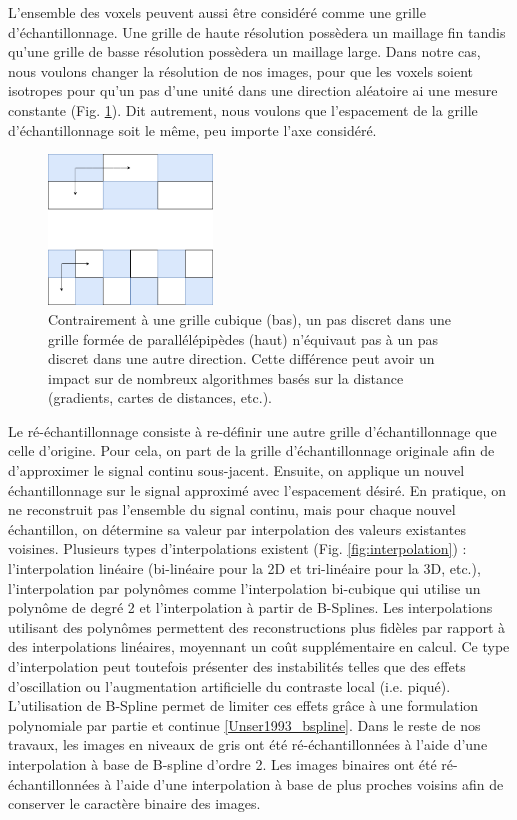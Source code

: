 L'ensemble des voxels peuvent aussi être considéré comme une grille d'échantillonnage. Une grille de haute résolution possèdera un maillage fin tandis qu'une grille de basse résolution possèdera un maillage large. Dans notre cas, nous voulons changer la résolution de nos images, pour que les voxels soient isotropes pour qu'un pas d'une unité dans une direction aléatoire ai une mesure constante (Fig. \ref{fig:resolution_voxels_shapes}). Dit autrement, nous voulons que l'espacement de la grille d'échantillonnage soit le même, peu importe l'axe considéré.

\begin{figure}[!ht]
  \centering
  \includegraphics[height=4cm]{Images/resolution_voxels_shape.png}
  \caption{Contrairement à une grille cubique (bas), un pas discret dans une grille formée de parallélépipèdes (haut) n'équivaut pas à un pas discret dans une autre direction. Cette différence peut avoir un impact sur de nombreux algorithmes basés sur la distance (gradients, cartes de distances, etc.).}
  \label{fig:resolution_voxels_shapes}
\end{figure}

Le ré-échantillonnage consiste à re-définir une autre grille d'échantillonnage que celle d'origine. Pour cela, on part de la grille d'échantillonnage originale afin de d'approximer le signal continu sous-jacent. Ensuite, on applique un nouvel échantillonnage sur le signal approximé avec l'espacement désiré. En pratique, on ne reconstruit pas l'ensemble du signal continu, mais pour chaque nouvel échantillon, on détermine sa valeur par interpolation des valeurs existantes voisines. Plusieurs types d'interpolations existent (Fig. \ref{fig:interpolation}) : l'interpolation linéaire (bi-linéaire pour la 2D et tri-linéaire pour la 3D, etc.), l'interpolation par polynômes comme l'interpolation bi-cubique qui utilise un polynôme de degré 2 et l'interpolation à partir de B-Splines. Les interpolations utilisant des polynômes permettent des reconstructions plus fidèles par rapport à des interpolations linéaires, moyennant un coût supplémentaire en calcul. Ce type d'interpolation peut toutefois présenter des instabilités telles que des effets d'oscillation ou l'augmentation artificielle du contraste local (i.e. piqué). L'utilisation de B-Spline permet de limiter ces effets grâce à une formulation polynomiale par partie et continue \ref{Unser1993_bspline}. Dans le reste de nos travaux, les images en niveaux de gris ont été ré-échantillonnées à l'aide d'une interpolation à base de B-spline d'ordre 2. Les images binaires ont été ré-échantillonnées à l'aide d'une interpolation à base de plus proches voisins afin de conserver le caractère binaire des images.


